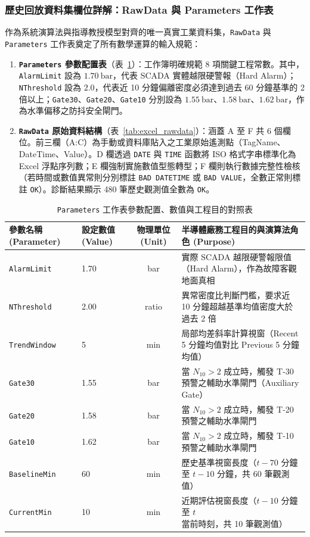 \documentclass[fontset=none, a4paper, 12pt]{ctexart}
\begin{document}
\begin{doublespace}
\subsubsection{歷史回放資料集欄位詳解：RawData 與 Parameters 工作表}
\label{sec:rawdata_parameters_detail}
作為系統演算法與指導教授模型對齊的唯一真實工業資料集，\texttt{RawData} 與 \texttt{Parameters} 工作表奠定了所有數學運算的輸入規範：
\begin{enumerate}
    \item \textbf{\texttt{Parameters} 參數配置表}（表~\ref{tab:excel_parameters}）：工作簿明確規範 8 項關鍵工程常數。其中，\texttt{AlarmLimit} 設為 $1.70\ \mathrm{bar}$，代表 SCADA 實體越限硬警報（Hard Alarm）；\texttt{NThreshold} 設為 $2.0$，代表近 10 分鐘偏離密度必須達到過去 60 分鐘基準的 2 倍以上；\texttt{Gate30}、\texttt{Gate20}、\texttt{Gate10} 分別設為 $1.55\ \mathrm{bar}$、$1.58\ \mathrm{bar}$、$1.62\ \mathrm{bar}$，作為水準偏移之防抖安全閘門。
    \item \textbf{\texttt{RawData} 原始資料結構}（表~\ref{tab:excel_rawdata}）：涵蓋 A 至 F 共 6 個欄位。前三欄（A:C）為手動或資料庫貼入之工業原始遙測點（TagName、DateTime、Value）。D 欄透過 \texttt{DATE} 與 \texttt{TIME} 函數將 ISO 格式字串標準化為 Excel 浮點序列數；E 欄強制實施數值型態轉型；F 欄則執行數據完整性檢核（若時間或數值異常則分別標註 \texttt{BAD DATETIME} 或 \texttt{BAD VALUE}，全數正常則標註 \texttt{OK}）。診斷結果顯示 480 筆歷史觀測值全數為 \texttt{OK}。
\end{enumerate}

\begin{table}[H]
\centering
\caption{\texttt{Parameters} 工作表參數配置、數值與工程目的對照表}
\label{tab:excel_parameters}
\footnotesize
\renewcommand{\arraystretch}{1.2}
\setlength{\tabcolsep}{5pt}
\begin{tabularx}{0.96\textwidth}{llcX}
\toprule
\textbf{參數名稱 (Parameter)} & \textbf{設定數值 (Value)} & \textbf{物理單位 (Unit)} & \textbf{半導體廠務工程目的與演算法角色 (Purpose)} \\
\midrule
\texttt{AlarmLimit} & 1.70 & bar & 實際 SCADA 越限硬警報限值（Hard Alarm），作為故障客觀地面真相 \\
\texttt{NThreshold} & 2.00 & ratio & 異常密度比判斷門檻，要求近 10 分鐘超越基準均值密度大於過去 2 倍 \\
\texttt{TrendWindow} & 5 & min & 局部均差斜率計算視窗（Recent 5 分鐘均值對比 Previous 5 分鐘均值） \\
\texttt{Gate30} & 1.55 & bar & 當 $N_{10} > 2$ 成立時，觸發 T-30 預警之輔助水準閘門（Auxiliary Gate） \\
\texttt{Gate20} & 1.58 & bar & 當 $N_{10} > 2$ 成立時，觸發 T-20 預警之輔助水準閘門 \\
\texttt{Gate10} & 1.62 & bar & 當 $N_{10} > 2$ 成立時，觸發 T-10 預警之輔助水準閘門 \\
\texttt{BaselineMin} & 60 & min & 歷史基準視窗長度（$t-70$ 分鐘至 $t-10$ 分鐘，共 60 筆觀測值） \\
\texttt{CurrentMin} & 10 & min & 近期評估視窗長度（$t-10$ 分鐘至 $t$ 當前時刻，共 10 筆觀測值） \\
\bottomrule
\end{tabularx}
\end{table}


\end{doublespace}
\end{document}
